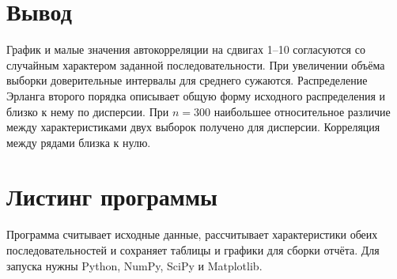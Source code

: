 \documentclass[a4paper,12pt]{article}
\begin{document}
\section{Вывод}
График и малые значения автокорреляции на сдвигах 1--10 согласуются
со случайным характером заданной последовательности. При увеличении объёма
выборки доверительные интервалы для среднего сужаются. Распределение Эрланга
второго порядка описывает общую форму исходного распределения и близко
к нему по дисперсии. При $n=300$ наибольшее относительное различие между
характеристиками двух выборок получено для дисперсии. Корреляция между рядами
близка к нулю.

\clearpage
\appendix
\section{Листинг программы}
Программа считывает исходные данные, рассчитывает характеристики обеих
последовательностей и сохраняет таблицы и графики для сборки отчёта.
Для запуска нужны Python, NumPy, SciPy и Matplotlib.
\end{document}
